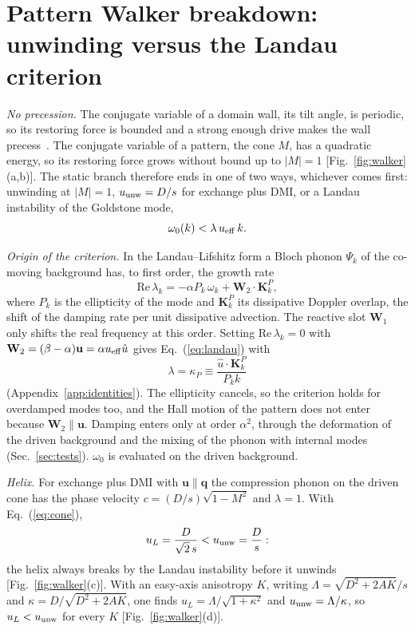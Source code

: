 \documentclass[prb,reprint,amsmath,amssymb,superscriptaddress,floatfix]{revtex4-2}
\newcommand{\ueff}{u_{\rm eff}}
\newcommand{\vu}{\mathbf u}
\newcommand{\Wtwo}{\mathbf W_2}
\newcommand{\kP}{\kappa_P}
\begin{document}
\section{Pattern Walker breakdown: unwinding versus the Landau criterion}
\label{sec:walker}

\textit{No precession.} The conjugate variable of a domain wall, its tilt angle, is periodic, so its restoring force is bounded and a strong enough drive makes the wall precess~\cite{SchryerWalker1974}. The conjugate variable of a pattern, the cone $M$, has a quadratic energy, so its restoring force grows without bound up to $|M|=1$ [Fig.~\ref{fig:walker}(a,b)]. The static branch therefore ends in one of two ways, whichever comes first: unwinding at $|M|=1$, $u_{\rm unw}=D/s$ for exchange plus DMI, or a Landau instability of the Goldstone mode,
\begin{equation}
\omega_0(k)<\lambda\,\ueff\,k .
\label{eq:landau}
\end{equation}

\textit{Origin of the criterion.} In the Landau--Lifshitz form a Bloch phonon $\Psi_k$ of the co-moving background has, to first order, the growth rate
\begin{equation}
\mathrm{Re}\,\lambda_k=-\alpha P_k\,\omega_k+\Wtwo\cdot\mathbf K^P_k ,
\label{eq:growth}
\end{equation}
where $P_k$ is the ellipticity of the mode and $\mathbf K^P_k$ its dissipative Doppler overlap, the shift of the damping rate per unit dissipative advection. The reactive slot $\mathbf W_1$ only shifts the real frequency at this order. Setting $\mathrm{Re}\,\lambda_k=0$ with $\Wtwo=(\beta-\alpha)\vu=\alpha\ueff\hat u$ gives Eq.~(\ref{eq:landau}) with
\begin{equation}
\lambda=\kP\equiv\frac{\hat u\cdot\mathbf K^P_k}{P_kk}
\label{eq:kP}
\end{equation}
(Appendix~\ref{app:identities}). The ellipticity cancels, so the criterion holds for overdamped modes too, and the Hall motion of the pattern does not enter because $\Wtwo\parallel\vu$. Damping enters only at order $\alpha^2$, through the deformation of the driven background and the mixing of the phonon with internal modes (Sec.~\ref{sec:tests}). $\omega_0$ is evaluated on the driven background.

\textit{Helix.} For exchange plus DMI with $\vu\parallel\mathbf q$ the compression phonon on the driven cone has the phase velocity $c=(D/s)\sqrt{1-M^2}$ and $\lambda=1$. With Eq.~(\ref{eq:cone}),
\begin{equation}
u_L=\frac{D}{\sqrt2\,s}<u_{\rm unw}=\frac{D}{s}:
\label{eq:uL}
\end{equation}
the helix always breaks by the Landau instability before it unwinds [Fig.~\ref{fig:walker}(c)]. With an easy-axis anisotropy $K$, writing $\Lambda=\sqrt{D^2+2AK}/s$ and $\kappa=D/\sqrt{D^2+2AK}$, one finds $u_L=\Lambda/\sqrt{1+\kappa^2}$ and $u_{\rm unw}=\Lambda/\kappa$, so $u_L<u_{\rm unw}$ for every $K$ [Fig.~\ref{fig:walker}(d)].
\end{document}
